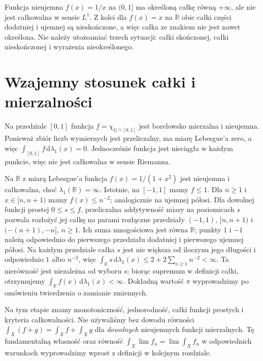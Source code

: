 \begin{uwaga}
Funkcja nieujemna $f(x)=1/x$ na $(0,1]$ ma
określoną całkę równą $+\infty$, ale nie jest
całkowalna w sensie $L^1$. Z kolei dla $f(x)=x$
na $\mathbb R$ obie całki części dodatniej i ujemnej
są nieskończone, a więc całka ze znakiem nie jest
nawet określona. Nie należy utożsamiać trzech sytuacji:
całki skończonej, całki nieskończonej i wyrażenia
nieokreślonego.
\end{uwaga}

\section{Wzajemny stosunek całki i mierzalności}

\begin{przyklad}
Na przedziale $[0,1]$ funkcja
$f=\chi_{\mathbb Q\cap[0,1]}$ jest borelowsko
mierzalna i nieujemna. Ponieważ zbiór liczb
wymiernych jest przeliczalny, ma miarę Lebesgue'a
zero, a więc $\int_{[0,1]} f\,\mathrm d\lambda_1(x)=0$.
Jednocześnie funkcja jest nieciągła w każdym punkcie,
więc nie jest całkowalna w sensie Riemanna.
\end{przyklad}

\begin{przyklad}
Na $\mathbb R$ z miarą Lebesgue'a funkcja
$f(x)=1/(1+x^2)$ jest nieujemna i całkowalna, choć
$\lambda_1(\mathbb R)=\infty$. Istotnie, na $[-1,1]$
mamy $f\le1$. Dla $n\ge1$ i $x\in[n,n+1)$ mamy
$f(x)\le n^{-2}$; analogicznie na ujemnej półosi.
Dla dowolnej funkcji prostej $0\le s\le f$,
przeliczalna addytywność miary na poziomicach $s$
pozwala rozłożyć jej całkę na parami rozłączne przedziały
$(-1,1)$, $[n,n+1)$ i $(-(n+1),-n]$, $n\ge1$.
Ich suma mnogościowa jest równa $\mathbb R$;
punkty $1$ i $-1$ należą odpowiednio do pierwszego
przedziału dodatniej i pierwszego ujemnej półosi.
Na każdym przedziale całka $s$ jest nie większa
od iloczynu jego długości i odpowiednio $1$ albo
$n^{-2}$, więc
$\int_{\mathbb R}s\,\mathrm d\lambda_1(x)
\le2+2\sum_{n\ge1}n^{-2}<\infty$.
Ta nierówność jest niezależna od wyboru $s$;
biorąc supremum w definicji całki, otrzymujemy
$\int_{\mathbb R} f(x)\,\mathrm d\lambda_1(x)<\infty$. Dokładną wartość $\pi$ wyprowadzimy
po omówieniu twierdzenia o zamianie zmiennych.
\end{przyklad}

\begin{uwaga}
Na tym etapie znamy monotoniczność, jednorodność,
całki funkcji prostych i kryteria całkowalności.
Nie używaliśmy bez dowodu równości
$\int_X(f+g)=\int_X f+\int_X g$ dla \emph{dowolnych}
nieujemnych funkcji mierzalnych. Tę fundamentalną
własność oraz równość $\int_X\lim f_n=\lim\int_X f_n$
w odpowiednich warunkach wyprowadzimy wprost
z definicji w kolejnym rozdziale.
\end{uwaga}
